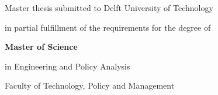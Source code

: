 \newcommand\textcaps[1]{\textsc{\MakeUppercase{#1}}}

\begin{titlepage}

%
%
%
%
%
%
%

\cleardoublepage
\if@twoside\else
    \thispagestyle{empty}%
    \vspace*{\fill}%
    \newpage%
\fi
\thispagestyle{empty}

\begin{center}


\vspace*{2\bigskipamount}

{\makeatletter
    \largetitlestyle\fontsize{24}{24}\selectfont\MakeUppercase{\@title}
    \makeatother}

{\makeatletter
\ifx\@subtitle\undefined\else
    \bigskip
    \largetitlefont\titleshape\fontsize{18}{18}\MakeUppercase{\textbf{\@subtitle}}
\fi
\makeatother}

\bigskip
\bigskip
{\Large Master thesis submitted to Delft University of Technology

in partial fulfillment of the requirements for the degree of

\bigskip

\textbf{\LARGE Master of Science}

\bigskip

in Engineering and Policy Analysis 

Faculty of Technology, Policy and Management}


\end{center}
\end{titlepage}
